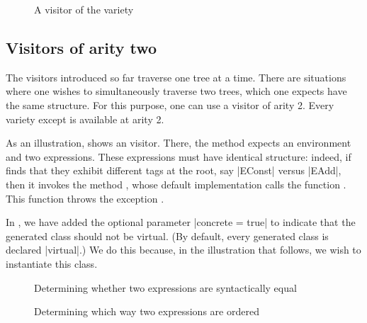 \documentclass[11pt,a4paper,twoside]{article}
\begin{document}

\begin{figure}[p]
\vspace{-\baselineskip}
\caption{A visitor of the \itertwo variety}
\label{fig:expr02}
\end{figure}

\begin{comment}
\begin{figure}[p]
\orig{expr03}
\vspace{-\baselineskip}
\processed{expr03}
\caption{A visitor of the \maptwo variety}
\label{fig:expr03}
\end{figure}
\end{comment}

\subsection{Visitors of arity two}
\label{sec:intro:aritytwo}

The visitors introduced so far traverse one tree at a time. There are
situations where one wishes to simultaneously traverse two trees, which one
expects have the same structure. For this purpose, one can use a visitor of
arity 2. Every variety except \mapendo is available at arity 2.

As an illustration,  shows an \itertwo visitor. There, the
method  expects an environment and two expressions. These
expressions must have identical structure: indeed, if 
finds that they exhibit different tags at the root, say \oc|EConst| versus
\oc|EAdd|, then it invokes the method , whose default
implementation calls the function . This function
throws the exception .

In , we have added the optional parameter
%
\oc|concrete = true|
%
to indicate that the generated class should not be virtual. (By default,
every generated class is declared \oc|virtual|.) We do this because, in
the illustration that follows, we wish to instantiate this class.

\begin{figure}[p]
\caption{Determining whether two expressions are syntactically equal}
\label{fig:expr05}
\end{figure}

\begin{figure}[p]
\caption{Determining which way two expressions are ordered}
\label{fig:expr05lexico}
\end{figure}
\end{document}
